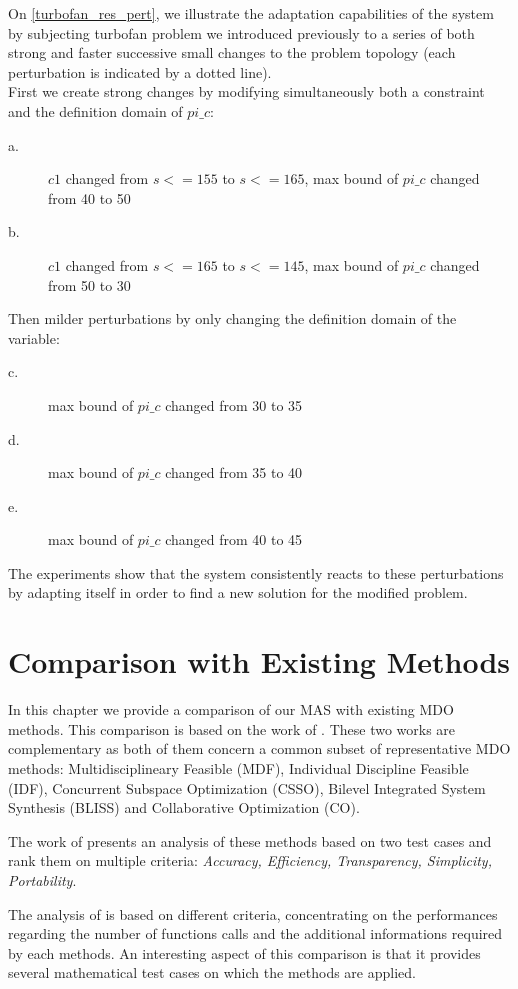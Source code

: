 On \figurename{} \ref{turbofan_res_pert}, we illustrate the adaptation capabilities of the system by subjecting turbofan problem we introduced previously to a series of both strong and faster successive small changes to the problem topology (each perturbation is indicated by a dotted line). \\
First we create strong changes by modifying simultaneously both a constraint and the definition domain of $pi\_c$:
\begin{description}
\item[a.] $c1$ changed from $s <= 155$ to $s <= 165$, max bound of $pi\_c$ changed from 40 to 50
\item[b.] $c1$ changed from $s <= 165$ to $s <= 145$, max bound of $pi\_c$ changed from 50 to 30
\end{description}
 Then milder perturbations by only changing the definition domain of the variable:
\begin{description}
\item[c.] max bound of $pi\_c$ changed from 30 to 35
\item[d.] max bound of $pi\_c$ changed from 35 to 40
\item[e.] max bound of $pi\_c$ changed from 40 to 45
\end{description}
The experiments show that the system consistently reacts to these perturbations by adapting itself in order to find a new solution for the modified problem.

\chapter{Comparison with Existing Methods}

In this chapter we provide a comparison of our MAS with existing MDO methods. This comparison is based on the work of \cite{perez2004evaluation, Yi2008}. These two works are complementary as both of them concern a common subset of representative MDO methods: Multidisciplineary Feasible (MDF), Individual Discipline Feasible (IDF), Concurrent Subspace Optimization (CSSO), Bilevel Integrated System Synthesis (BLISS) and Collaborative Optimization (CO).

The work of \cite{perez2004evaluation} presents an analysis of these methods based on two test cases and rank them on multiple criteria: \emph{Accuracy, Efficiency, Transparency, Simplicity, Portability}.

The analysis of \cite{Yi2008} is based on different criteria, concentrating on the performances regarding the number of functions calls and the additional informations required by each methods. An interesting aspect of this comparison is that it provides several mathematical test cases on which the methods are applied.

